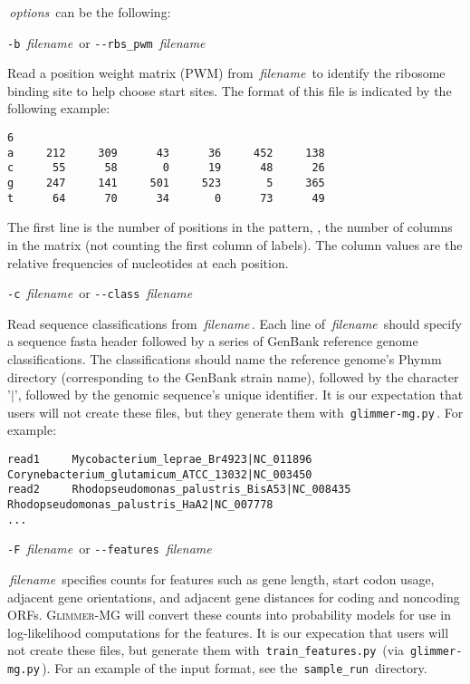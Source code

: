 \documentclass[fleqn,titlepage,11pt]{article}
\def\Desc#1{\,\mbox{\emph{#1}}\,}
\def\Gmg{\textsc{Glimmer-MG}}
\def\Pg#1{\texttt{#1}}
\begin{document}
\Desc{options} can be the following:
\bl{}\RaggedRight

\exdent
  \verb`-b` \Desc{filename} \enskip or \enskip \verb`--rbs_pwm` \Desc{filename}

  Read a position weight matrix (PWM) from \Desc{filename} to identify
  the ribosome binding site to help choose start sites.  The format of
  this file is indicated by the following example:
\BSV
\begin{verbatim}
6
a     212     309      43      36     452     138
c      55      58       0      19      48      26
g     247     141     501     523       5     365
t      64      70      34       0      73      49
\end{verbatim}
\ESV
  The first line is the number of positions in the pattern, \ie,
  the number of columns in the matrix (not counting
  the first column of labels).  The column values are the relative
  frequencies of nucleotides at each position.

\exdent
  \verb`-c` \Desc{filename} \enskip or \enskip \verb`--class` \Desc{filename}

  Read sequence classifications from \Desc{filename}. Each line of
  \Desc{filename} should specify a sequence fasta header followed by a
  series of GenBank reference genome classifications. The
  classifications should name the reference genome's Phymm directory
  (corresponding to the GenBank strain name), followed by the
  character '$|$', followed by the genomic sequence's unique
  identifier. It is our expectation that users will not create these
  files, but they generate them with \,\Pg{glimmer-mg.py}\,. For
  example:

\BSV
\footnotesize{
\begin{verbatim}
read1     Mycobacterium_leprae_Br4923|NC_011896 Corynebacterium_glutamicum_ATCC_13032|NC_003450
read2     Rhodopseudomonas_palustris_BisA53|NC_008435 Rhodopseudomonas_palustris_HaA2|NC_007778
...
\end{verbatim}
}
\ESV

\exdent
  \verb`-F` \Desc{filename} \enskip or \enskip \verb`--features` \Desc{filename}

  \Desc{filename} specifies counts for features such as gene length,
  start codon usage, adjacent gene orientations, and adjacent gene
  distances for coding and noncoding ORFs. \Gmg{} will convert these
  counts into probability models for use in log-likelihood
  computations for the features. It is our expecation that users will
  not create these files, but generate them with
  \,\Pg{train\_features.py}\, (via \,\Pg{glimmer-mg.py}\,). For an
  example of the input format, see the \,\Pg{sample\_run}\, directory.
\end{document}
